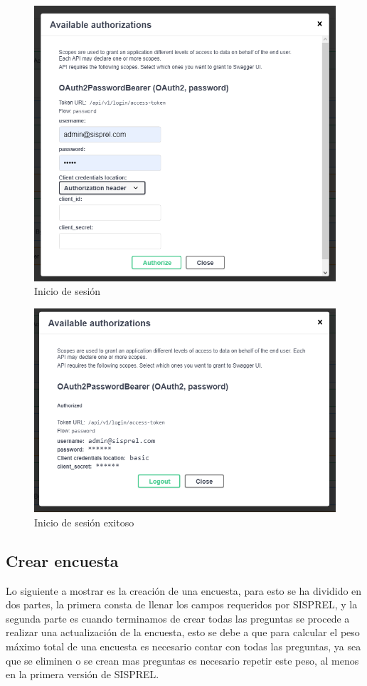 \begin{figure}[!htb]
    \centering
    \includegraphics[scale=.5]{TT/img/pruebas/test_login_admin.png}
    \caption{Inicio de sesión}
    \label{graphic:iniciarsesion}
\end{figure}

\begin{figure}[!htb]
    \centering
    \includegraphics[scale=.5]{TT/img/pruebas/test_login_succesful.png}
    \caption{Inicio de sesión exitoso}
    \label{graphic:iniciodesesionexitoso}
\end{figure}

\subsection{Crear encuesta}
Lo siguiente a mostrar es la creación de una encuesta, para esto se ha dividido en dos partes, la primera consta de llenar los campos requeridos por SISPREL, y la segunda parte es cuando terminamos de crear todas las preguntas se procede a realizar una actualización de la encuesta, esto se debe a que para calcular el peso máximo total de una encuesta es necesario contar con todas las preguntas, ya sea que se eliminen o se crean mas preguntas es necesario repetir este peso, al menos en la primera versión de SISPREL.

